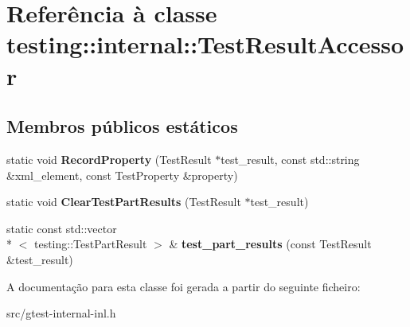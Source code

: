 \hypertarget{classtesting_1_1internal_1_1TestResultAccessor}{\section{Referência à classe testing\-:\-:internal\-:\-:Test\-Result\-Accessor}
\label{classtesting_1_1internal_1_1TestResultAccessor}
}
\subsection*{Membros públicos estáticos}
\begin{DoxyCompactItemize}
\item 
\hypertarget{classtesting_1_1internal_1_1TestResultAccessor_abcc4b32d1b201eeef92f0ec0ae161cf9}{static void {\bfseries Record\-Property} (Test\-Result $\ast$test\-\_\-result, const std\-::string \&xml\-\_\-element, const Test\-Property \&property)}\label{classtesting_1_1internal_1_1TestResultAccessor_abcc4b32d1b201eeef92f0ec0ae161cf9}

\item 
\hypertarget{classtesting_1_1internal_1_1TestResultAccessor_a53c626632bac65d82d88e432072b866b}{static void {\bfseries Clear\-Test\-Part\-Results} (Test\-Result $\ast$test\-\_\-result)}\label{classtesting_1_1internal_1_1TestResultAccessor_a53c626632bac65d82d88e432072b866b}

\item 
\hypertarget{classtesting_1_1internal_1_1TestResultAccessor_a55d771904317c1b0cc380104d175f1db}{static const std\-::vector\\*
$<$ testing\-::\-Test\-Part\-Result $>$ \& {\bfseries test\-\_\-part\-\_\-results} (const Test\-Result \&test\-\_\-result)}\label{classtesting_1_1internal_1_1TestResultAccessor_a55d771904317c1b0cc380104d175f1db}

\end{DoxyCompactItemize}


A documentação para esta classe foi gerada a partir do seguinte ficheiro\-:\begin{DoxyCompactItemize}
\item 
src/gtest-\/internal-\/inl.\-h\end{DoxyCompactItemize}
